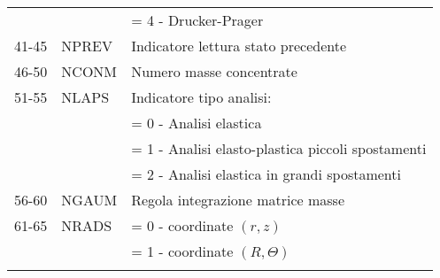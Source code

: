 \begin{tabular}{rll}
	             &                                & = 4 - Drucker-Prager                              \\
	41-45        & NPREV                          & Indicatore lettura stato precedente               \\
	46-50        & NCONM                          & Numero masse concentrate                          \\
	51-55        & NLAPS                          & Indicatore tipo analisi:                          \\
	             &                                & = 0 - Analisi elastica                            \\
	             &                                & = 1 - Analisi elasto-plastica piccoli spostamenti \\
	             &                                & = 2 - Analisi elastica in grandi spostamenti      \\
	56-60        & NGAUM                          & Regola integrazione matrice masse                 \\         
	61-65        & NRADS                          & = 0 - coordinate $(r, z)$                         \\
	             &                                & = 1 - coordinate $(R, \varTheta)$                 \\
	             &                                &                                                   \\	             
\end{tabular}

